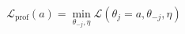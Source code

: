 \documentclass{article}
\begin{document}
\fontsize{22}{29}\selectfont
\[
\mathcal L_{\mathrm{prof}}(a)=\min_{\theta_{-j},\eta}\mathcal L(\theta_j=a,\theta_{-j},\eta)
\]
\end{document}
